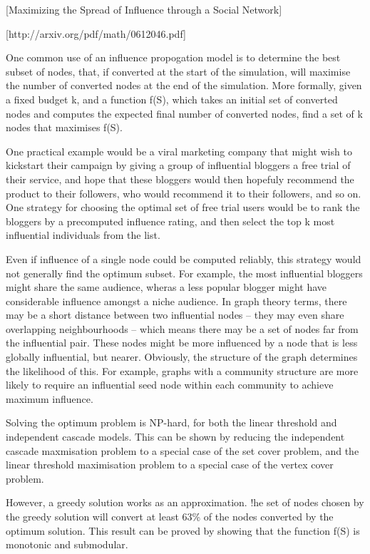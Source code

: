 [Maximizing the Spread of Influence through a Social Network]

[http://arxiv.org/pdf/math/0612046.pdf]

One common use of an influence propogation model is to determine the best subset of nodes, that, if converted at the start of the simulation, will maximise the number of converted nodes at the end of the simulation. More formally, given a fixed budget k, and a function f(S), which takes an initial set of converted nodes and computes the expected final number of converted nodes, find a set of k nodes that maximises f(S).

One practical example would be a viral marketing company that might wish to kickstart their campaign by giving a group of influential bloggers a free trial of their service, and hope that these bloggers would then hopefuly recommend the product to their followers, who would recommend it to their followers, and so on. One strategy for choosing the optimal set of free trial users would be to rank the bloggers by a precomputed influence rating, and then select the top k most influential individuals from the list.

Even if influence of a single node could be computed reliably, this strategy would not generally find the optimum subset. For example, the most influential bloggers might share the same audience, wheras a less popular blogger might have considerable influence amongst a niche audience. In graph theory terms, there may be a short distance between two influential nodes -- they may even share overlapping neighbourhoods -- which means there may be a set of nodes far from the influential pair. These nodes might be more influenced by a node that is less globally influential, but nearer. Obviously, the structure of the graph determines the likelihood of this. For example, graphs with a community structure are more likely to require an influential seed node within each community to achieve maximum influence.

Solving the optimum problem is NP-hard, for both the linear threshold and independent cascade models. This can be shown by reducing the independent cascade maxmisation problem to a special case of the set cover problem, and the linear threshold maximisation problem to a special case of the vertex cover problem.

However, a greedy solution works as an approximation. !he set of nodes chosen by the greedy solution will convert at least 63\% of the nodes converted by the optimum solution. This result can be proved by showing that the function f(S) is monotonic and submodular.


